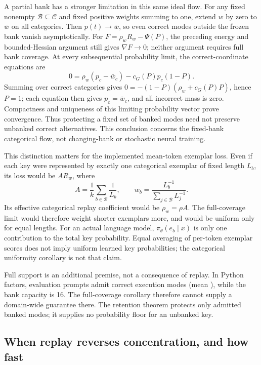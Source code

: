 \documentclass{article}
\newcommand{\1}{\mathbf 1}
\theoremstyle{remark}
\theoremstyle{definition}
\theoremstyle{plain}
\begin{document}
A partial bank has a stronger limitation in this same ideal flow. For any
fixed nonempty $\mathcal B\subseteq\mathcal C$ and fixed positive weights
summing to one, extend $w$ by zero to $\bar w$ on all categories. Then
$p(t)\to\bar w$, so even correct modes outside the frozen bank vanish
asymptotically. For $F=\rho_wR_w-\Psi(P)$, the preceding energy and
bounded-Hessian argument still gives $\nabla F\to0$; neither argument
requires full bank coverage.
At every subsequential probability limit, the correct-coordinate equations are
\[
 0=\rho_w(p_c-\bar w_c)-c_G(P)p_c(1-P).
\]
Summing over correct categories gives
$0=-(1-P)(\rho_w+c_G(P)P)$, hence $P=1$; each equation then gives
$p_c=\bar w_c$, and all incorrect mass is zero. Compactness and uniqueness
of this limiting probability vector prove convergence. Thus protecting a
fixed set of banked modes need not preserve unbanked correct alternatives.
This conclusion concerns the fixed-bank categorical flow, not changing-bank
or stochastic neural training.

This distinction matters for the implemented mean-token exemplar loss.
Even if each key were represented by exactly one categorical exemplar of
fixed length $L_b$, its loss would be $A R_w$, where
\[
 A=\frac1k\sum_{b\in\mathcal B}\frac1{L_b},\qquad
 w_b=\frac{L_b^{-1}}{\sum_{j\in\mathcal B}L_j^{-1}}.
\]
Its effective categorical replay coefficient would be $\rho_w=\rho A$.
The full-coverage limit would therefore weight shorter exemplars more, and
would be uniform only for equal lengths. For an actual language model,
$\pi_\theta(e_b\mid x)$ is only one contribution to the total key probability.
Equal averaging of per-token exemplar scores does not imply uniform learned
key probabilities; the categorical uniformity corollary is not that claim.

Full support is an additional premise, not a consequence of replay. In
Python factors, evaluation prompts admit \MDvmPythonRange{} correct execution
modes (mean \MDvmPythonMean{}), while the bank capacity is 16. The
full-coverage corollary therefore cannot supply a domain-wide guarantee there. The retention theorem protects only
admitted banked modes; it supplies no probability floor for an unbanked key.

\subsection{When replay reverses concentration, and how fast}
\label{app:theory-replay-finite-horizon}
\end{document}
